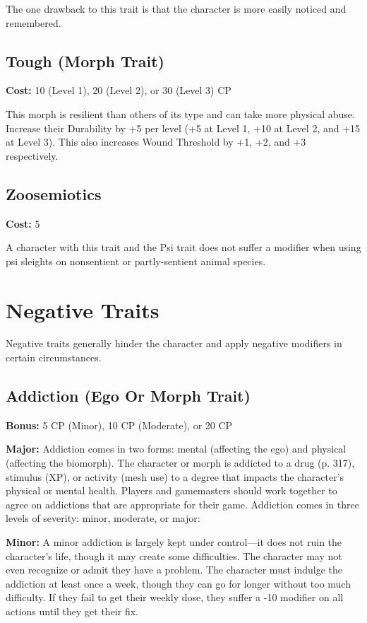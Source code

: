 The one drawback to this trait is that the character is more easily noticed and remembered. 

\subsection{Tough (Morph Trait)} \label{sec:traits-tough} 

\textbf{Cost:} 10 (Level 1), 20 (Level 2), or 30 (Level 3) CP 

This morph is resilient than others of its type and can take more physical abuse. Increase their Durability by +5 per level (+5 at Level 1, +10 at Level 2, and +15 at Level 3). This also increases Wound Threshold by +1, +2, and +3 respectively. 

\subsection{Zoosemiotics} \label{sec:traits-zoosemiotics} 

\textbf{Cost:} 5 

A character with this trait and the Psi trait does not suffer a modifier when using psi sleights on nonsentient or partly-sentient animal species. 

\section{Negative Traits} \label{sec:negative-traits} 

Negative traits generally hinder the character and apply negative modifiers in certain circumstances. 

\subsection{Addiction (Ego Or Morph Trait)} \label{sec:traits-addiction} 

\textbf{Bonus:} 5 CP (Minor), 10 CP (Moderate), or 20 CP 

\textbf{Major:} Addiction comes in two forms: mental (affecting the ego) and physical (affecting the biomorph). The character or morph is addicted to a drug (p. 317), stimulus (XP), or activity (mesh use) to a degree that impacts the character’s physical or mental health. Players and gamemasters should work together to agree on addictions that are appropriate for their game. Addiction comes in three levels of severity: minor, moderate, or major: 

\textbf{Minor:} A minor addiction is largely kept under control—it does not ruin the character’s life, though it may create some difficulties. The character may not even recognize or admit they have a problem. The character must indulge the addiction at least once a week, though they can go for longer without too much difficulty. If they fail to get their weekly dose, they suffer a -10 modifier on all actions until they get their fix. 

